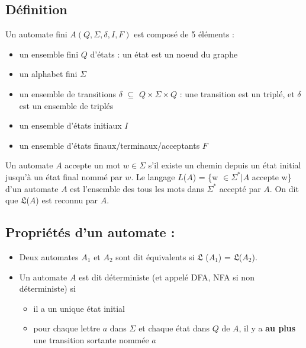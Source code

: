 \documentclass{article}
\begin{document}
\subsection{Définition}
Un automate fini $A(Q,\Sigma,\delta,I,F)$ est composé de 5 éléments :
\begin{itemize}
    \item un ensemble fini $Q$ d'états : un état est un noeud du graphe
    \item un alphabet fini $\Sigma$
    \item un ensemble de transitions $\delta$ $\subseteq$ $Q \times \Sigma \times Q$ : une transition est un triplé, et $\delta$ est un ensemble de triplés
    \item un ensemble d'états initiaux $I$
    \item un ensemble d'états finaux/terminaux/acceptants $F$
\end{itemize}
Un automate $A$ accepte un mot $w \in \Sigma$ s'il existe un chemin depuis un état initial jusqu'à un état final nommé par $w$.\newline
Le langage $L$($A$) = \{w $\in \Sigma^{*} | A$ accepte w\} d'un automate $A$ est l'ensemble des tous les mots dans $\Sigma^{*}$ accepté par $A$. On dit que $\mathfrak{L}$($A$) est reconnu par $A$.\newline

\subsection{Propriétés d'un automate :}
\begin{itemize}
    \item Deux automates $A_{1}$ et $A_{2}$ sont dit équivalents si $\mathfrak{L}$ ($A_{1}$) = $\mathfrak{L}$($A_{2}$).
    \item Un automate $A$ est dit déterministe (et appelé DFA, NFA si non déterministe) si
    \begin{itemize}
        \item il a un unique état initial
        \item pour chaque lettre $a$ dans $\Sigma$ et chaque état dans $Q$ de $A$, il y a \textbf{au plus} une transition sortante nommée $a$
    \end{itemize}
\end{itemize}
\newpage
\end{document}
